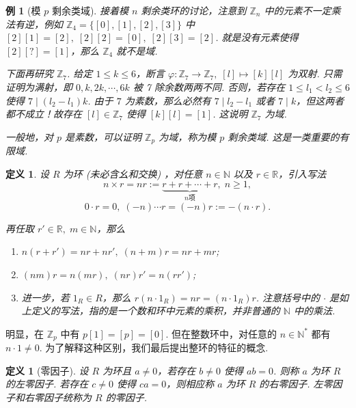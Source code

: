 \documentclass[10pt,openany]{article}
\theoremstyle{thmstyle} %
\theoremstyle{defstyle} %
\newtheorem{definition}[theorem]{定义}
\theoremstyle{prostyle} %
\theoremstyle{exastyle}
\newtheorem{example}[theorem]{例}
\theoremstyle{remstyle}
\begin{document}
\begin{example}[模 \( p \) 剩余类域]
	接着模 \( n \) 剩余类环的讨论，注意到 \( \mathbb{Z}_n \) 中的元素不一定乘法有逆，例如 \( \mathbb{Z}_4=\{[0],[1],[2],[3]\} \) 中 \( [2][1]=[2], \; [2][2]=[0], \; [2][3]=[2] \). 就是没有元素使得 \( [2][?]=[1] \)，那么 \( \mathbb{Z}_4 \) 就不是域.
	 
	\vspace{1ex}
	
	下面再研究 \( \mathbb{Z}_7 \). 给定 \( 1 \leq k \leq 6  \)，断言 \( \varphi: \mathbb{Z}_7 \to \mathbb{Z}_7, \; [l] \mapsto [k][l] \) 为双射. 只需证明为满射，即 \( 0,k,2k,\cdots,6k \) 被 7 除余数两两不同. 否则，若存在 \( 1 \leq l_1 < l_2 \leq 6 \) 使得 \( 7 \mid (l_2-l_1)k \). 由于 \( 7 \) 为素数，那么必然有 \( 7 \mid l_2-l_1 \) 或者 \( 7 \mid k \)，但这两者都不成立！故存在 \( [l] \in \mathbb{Z}_7 \) 使得 \( [k][l]=[1] \). 这说明 \( \mathbb{Z}_7 \) 为域.
	
	\vspace{1ex}
	
	一般地，对 \( p \) 是素数，可以证明 \( \mathbb{Z}_p \) 为域，称为模 \( p \) 剩余类域. 这是一类重要的有限域. 
\end{example}


\begin{definition}
	设 \( R \) 为环 (未必含幺和交换) ，对任意 \( n \in \mathbb{N} \) 以及 \( r \in \mathbb{R} \)，引入写法
	\[ n \times r=nr:=\underbrace{r+r+\cdots+r}_{n \text{项}}, \; n \geq 1, \]
	\[ 0 \cdot r =0, \; (-n) \cdots r=(-n)r:=-(n \cdot r). \]
	
	再任取 \( r' \in \mathbb{R}, \; m \in \mathbb{N} \)，那么
	\begin{enumerate}[(1)]
		\item \( n(r+r')=nr+nr', \; (n+m)r=nr+mr \);
		\item \( (nm)r=n(mr), \; (nr)r'=n(rr') \);
		\item 进一步，若 \( 1_R \in R \)，那么 \( r(n \cdot 1_R)=nr=(n \cdot 1_R)r \). 注意括号中的 \( \cdot \) 是如上定义的写法，指的是一个数和环中元素的乘积，并非普通的 \( \mathbb{N} \) 中的乘法.
	\end{enumerate}
\end{definition}

明显，在 \( \mathbb{Z}_p\) 中有 \( p[1]=[p]=[0] \). 但在整数环中，对任意的 \( n \in \mathbb{N}^* \) 都有 \( n \cdot 1 \neq 0 \). 为了解释这种区别，我们最后提出整环的特征的概念.

\begin{definition}[零因子]
	设 \( R \) 为环且 \( a \neq 0 \)，若存在 \( b \neq 0 \) 使得 \( ab=0 \). 则称 \( a \) 为环 \( R \) 的左零因子. 若存在 \( c \neq 0 \) 使得 \( ca = 0 \)，则相应称 \( a \) 为环 \( R \) 的右零因子. 左零因子和右零因子统称为 \( R \) 的零因子.
\end{definition}
\end{document}
